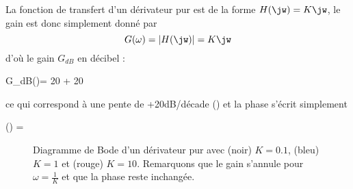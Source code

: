 La fonction de transfert d'un dérivateur pur est de la forme $H(\jw)=K\jw$,
le gain est donc simplement donné par 
$$
G(\omega)=|H(\jw)|=K\jw
$$ 
d'où le gain $G_{dB}$ en décibel :
\begin{bequation}
G_{dB}(\omega)= 20 + 20\log{\omega}
\end{bequation}
ce qui correspond à une pente de +20dB/décade () et
la phase s'écrit simplement 
\begin{bequation}
\phi(\omega) = 
\end{bequation}
\begin{figure}[!htb]
    \centering
    

    
    \caption{Diagramme de Bode d'un dérivateur pur 
             avec (noir) $K=0.1$, (bleu) $K=1$ et (rouge) $K=10$. Remarquons 
             que le gain s'annule pour $\omega=\frac{1}{K}$ et que la phase 
             reste inchangée.\label{fig-bode_deriv}}
\end{figure}
